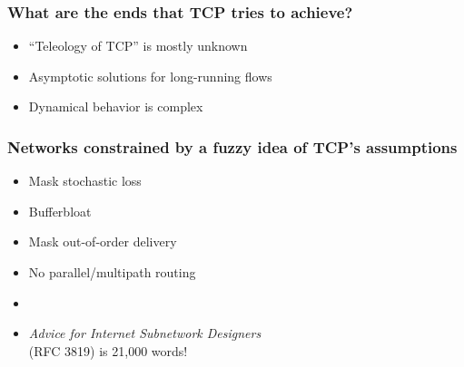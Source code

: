 \documentclass[svgnames]{beamer}
\begin{document}
\begin{frame}
\frametitle{What are the ends that TCP tries to achieve?}

\begin{itemize}

\Large

\item ``Teleology of TCP'' is mostly unknown

\item Asymptotic solutions for long-running flows

\item Dynamical behavior is complex

\end{itemize}

\end{frame}

\begin{frame}
\frametitle{Networks constrained by a fuzzy idea of TCP's assumptions}

\Large

\begin{itemize}
\item Mask stochastic loss
\item Bufferbloat
\item Mask out-of-order delivery
\item No parallel/multipath routing
\item[]
\item[] {\it Advice for Internet Subnetwork Designers}\\ (RFC 3819) is 21,000 words!
\end{itemize}

\end{frame}
\end{document}
